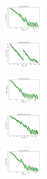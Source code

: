 \begin{figure}[H]
    \centering
    \begin{subfigure}
        \centering
        \includegraphics[width=0.234\textwidth]{img/ils/iris_set_const_20_949004259_cost.png}
    \end{subfigure}
    \hfill
    \begin{subfigure}
        \centering
        \includegraphics[width=0.234\textwidth]{img/ils/ecoli_set_const_20_949004259_cost.png}
    \end{subfigure}
    \hfill
    \begin{subfigure}
        \centering
        \includegraphics[width=0.234\textwidth]{img/ils/rand_set_const_20_949004259_cost.png}
    \end{subfigure}
    \hfill
    \begin{subfigure}
        \centering
        \includegraphics[width=0.234\textwidth]{img/ils/newthyroid_set_const_20_949004259_cost.png}
    \end{subfigure}
    \hfill
    \begin{subfigure}
        \centering
        \includegraphics[width=0.234\textwidth]{img/ils/iris_set_const_20_589741062_cost.png}
    \end{subfigure}
    \hfill
    \begin{subfigure}

\end{subfigure}
\end{figure}
